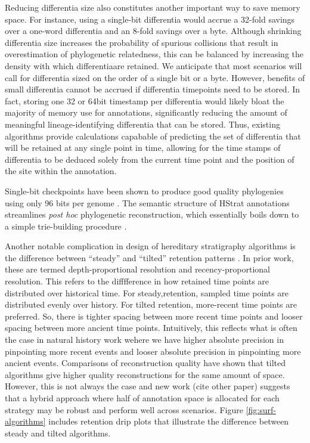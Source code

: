 Reducing differentia size also constitutes another important way to save memory space.
For instance, using a single-bit differentia would accrue a 32-fold savings over a one-word differentia and an 8-fold savings over a byte.
Although shrinking differentia size increases the probability of spurious collisions that result in overestimation of phylogenetic relatedness, this can be balanced by increasing the density with which differentiaare retained.
We anticipate that most scenarios will call for differentia sized on the order of a single bit or a byte.
However, benefits of small differentia cannot be accrued if differentia timepoints need to be stored.
In fact, storing one 32 or 64bit timestamp per differentia would likely bloat the majority of memory use for annotations, significantly reducing the amount of meaningful lineage-identifying differentia that can be stored.
Thus, existing algorithms provide calculations capabable of predicting the set of differentia that will be retained at any single point in time, allowing for the time stamps of differentia to be deduced solely from the current time point and the position of the site within the annotation.

Single-bit checkpoints have been shown to produce good quality phylogenies using only 96 bits per genome \citep{moreno2023toward}.
The semantic structure of HStrat annotations streamlines \textit{post hoc} phylogenetic reconstruction, which essentially boils down to a simple trie-building procedure
\citep{moreno2024analysis}.

Another notable complication in design of hereditary stratigraphy algorithms is the difference between ``steady'' and ``tilted'' retention patterns \citep{TODOFROMPREPRINT}.
In prior work, these are termed depth-proportional resolution and recency-proportional resolution.
This refers to the difffference in how retained time points are distributed over historical time.
For steady,retention, sampled time points are distributed evenly over history.
For tilted retention, more-recent time points are preferred.
So, there is tighter spacing between more recent time points and looser spacing between more ancient time points.
Intuitively, this reflects what is often the case in natural history work wehere we have higher absolute precision in pinpointing more recent events and looser absolute precision in pinpointing more ancient events.
Comparisons of reconstruction quality have shown that tilted algorithms give higher quality reconstructions for the same amount of space.
However, this is not always the case and new work (cite other paper) suggests that a hybrid approach where half of annotation space is allocated for each strategy may be robust and perform well across scenarios.
Figure \ref{fig:surf-algorithms} includes retention drip plots that illustrate the difference between steady and tilted algorithms.

